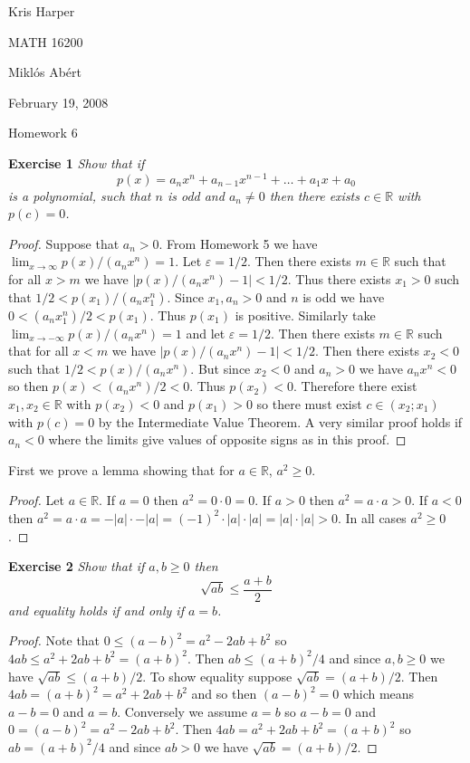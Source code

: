 \documentclass{article}
\begin{document}
\begin{flushright}
Kris Harper

MATH 16200

Mikl\'{o}s Ab\'{e}rt

February 19, 2008
\end{flushright}

\begin{center}
Homework 6
\end{center}

\begin{flushleft}

\textbf{Exercise 1}
\textsl{Show that if
\[
p(x) = a_n x^n + a_{n-1} x^{n-1} + \dots + a_1 x + a_0
\]
is a polynomial, such that $n$ is odd and $a_n \neq 0$ then there exists $c \in \mathbb{R}$ with $p(c) = 0$.}
\begin{proof}
Suppose that $a_n > 0$. From Homework 5 we have $\lim_{x \rightarrow \infty} p(x)/(a_n x^n) = 1$. Let $\varepsilon = 1/2$. Then there exists $m \in \mathbb{R}$ such that for all $x > m$ we have $|p(x)/(a_n x^n) - 1| < 1/2$. Thus there exists $x_1>0$ such that $1/2 < p(x_1)/(a_n x_1^n)$. Since $x_1, a_n > 0$ and $n$ is odd we have $0 < (a_n x_1^n)/2 < p(x_1)$. Thus $p(x_1)$ is positive. Similarly take $\lim_{x \rightarrow -\infty} p(x)/(a_n x^n) = 1$ and let $\varepsilon = 1/2$. Then there exists $m \in \mathbb{R}$ such that for all $x<m$ we have $|p(x)/(a_n x^n)-1| < 1/2$. Then there exists $x_2 < 0$ such that $1/2 < p(x)/(a_n x^n)$. But since $x_2<0$ and $a_n > 0$ we have $a_n x^n < 0$ so then $p(x) < (a_n x^n)/2 < 0$. Thus $p(x_2) < 0$. Therefore there exist $x_1,x_2 \in \mathbb{R}$ with $p(x_2) < 0$ and $p(x_1) > 0$ so there must exist $c \in (x_2;x_1)$ with $p(c) = 0$ by the Intermediate Value Theorem. A very similar proof holds if $a_n < 0$ where the limits give values of opposite signs as in this proof.
\end{proof}

First we prove a lemma showing that for $a \in \mathbb{R}$, $a^2 \geq 0$.
\begin{proof}
Let $a \in \mathbb{R}$. If $a=0$ then $a^2=0 \cdot 0=0$. If $a > 0$ then $a^2 = a \cdot a > 0$. If $a<0$ then $a^2 = a \cdot a = - |a| \cdot - |a| = (-1)^2 \cdot |a| \cdot |a| = |a| \cdot |a| > 0$. In all cases $a^2 \geq 0$.
\end{proof}

\textbf{Exercise 2}
\textsl{Show that if $a,b \geq 0$ then
\[
\sqrt{ab} \leq \frac{a+b}{2}
\]
and equality holds if and only if $a=b$.}
\begin{proof}
Note that $0 \leq (a-b)^2 = a^2 - 2ab + b^2$ so $4ab \leq a^2 + 2ab + b^2 = (a+b)^2$. Then $ab \leq (a+b)^2/4$ and since $a,b \geq 0$ we have $\sqrt{ab} \leq (a+b)/2$. To show equality suppose $\sqrt{ab} = (a+b)/2$. Then $4ab=(a+b)^2=a^2+2ab+b^2$ and so then $(a-b)^2=0$ which means $a-b=0$ and $a=b$. Conversely we assume $a=b$ so $a-b=0$ and $0=(a-b)^2=a^2-2ab+b^2$. Then $4ab=a^2 + 2ab + b^2=(a+b)^2$ so $ab=(a+b)^2/4$ and since $ab>0$ we have $\sqrt{ab} = (a+b)/2$.
\end{proof}


\end{flushleft}
\end{document}
